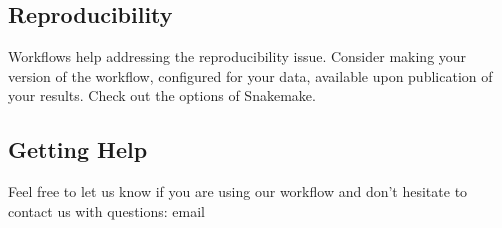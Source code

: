 \documentclass[letterpaper,10pt,english]{sphinxhowto}
\begin{document}
\subsection{Reproducibility}
\label{\detokenize{index:reproducibility}}
Workflows help addressing the reproducibility issue. Consider making your version of the workflow, configured for your data, available upon publication of your results. Check out the  options of Snakemake.


\subsection{Getting Help}
\label{\detokenize{index:getting-help}}
Feel free to let us know if you are using our workflow and don’t hesitate to contact us with questions: email 



\renewcommand{\indexname}{Index}
\printindex
\end{document}
